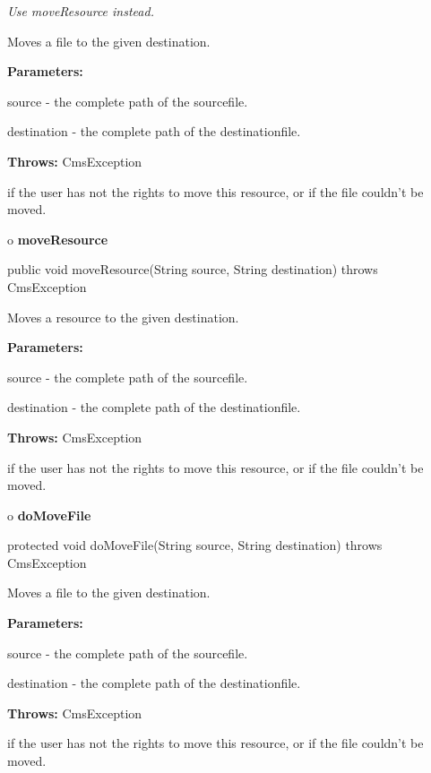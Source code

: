 \begin{description}
 {\it Use moveResource instead.}

Moves a file to the given destination.

\begin{description}
\item {\bf Parameters:}

source - the complete path of the sourcefile.

destination - the complete path of the destinationfile.
\item {\bf Throws:} CmsException

if the user has not the rights to move this resource, or if the file couldn't
be moved.
\end{description}

\end{description}

o {\bf moveResource}

\begin{PRE}
 public void moveResource(String source,
                          String destination) throws CmsException
\end{PRE}

\begin{description}
\htmlDD Moves a resource to the given destination.

\begin{description}
\item {\bf Parameters:}

source - the complete path of the sourcefile.

destination - the complete path of the destinationfile.
\item {\bf Throws:} CmsException

if the user has not the rights to move this resource, or if the file couldn't
be moved.
\end{description}

\end{description}

o {\bf doMoveFile}

\begin{PRE}
 protected void doMoveFile(String source,
                           String destination) throws CmsException
\end{PRE}

\begin{description}
\htmlDD Moves a file to the given destination.

\begin{description}
\item {\bf Parameters:}

source - the complete path of the sourcefile.

destination - the complete path of the destinationfile.
\item {\bf Throws:} CmsException

if the user has not the rights to move this resource, or if the file couldn't
be moved.
\end{description}

\end{description}

